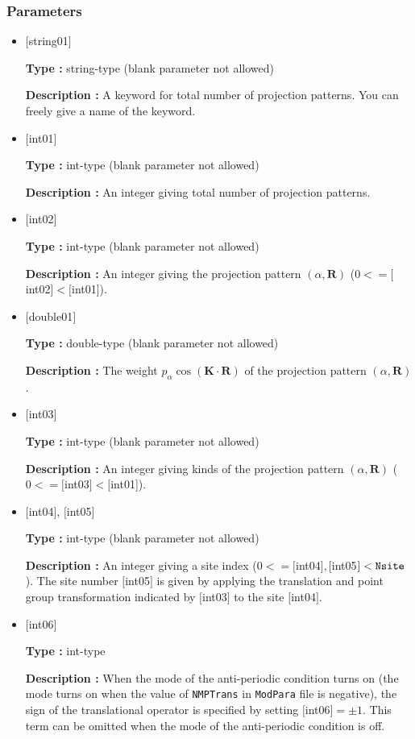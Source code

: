 \subsubsection{Parameters}
 \begin{itemize}

   \item  $[$string01$]$
   
    {\bf Type :} string-type (blank parameter not allowed)

   {\bf Description :} A keyword for total number of projection patterns. You can freely give a name of the keyword.

   \item  $[$int01$]$
   
    {\bf Type :} int-type (blank parameter not allowed)

   {\bf Description :} An integer giving total number of projection patterns. 

  \item  $[$int02$]$
   
 {\bf Type :} int-type (blank parameter not allowed)

{\bf Description :} An integer giving the projection pattern $(\alpha, {\bm R})$ ($0<= [$int02$]<[$int01]). 
 
  \item  $[$double01$]$
   
 {\bf Type :} double-type (blank parameter not allowed)

{\bf Description :} The weight $p_{\alpha}\cos ({\bm K}\cdot {\bm R})$ of the projection pattern $(\alpha, {\bm R})$.
 
 \item  $[$int03$]$
   
   {\bf Type :} int-type (blank parameter not allowed)

  {\bf Description :} An integer giving kinds of the projection pattern $(\alpha, {\bm R})$  ($0<= [$int03$]<[$int01]). 

 \item  $[$int04$]$, $[$int05$]$
   
   {\bf Type :} int-type (blank parameter not allowed)

  {\bf Description :} An integer giving a site index ($0<= [$int04$], [$int05$]<\verb|Nsite|$). 
  The site number $[$int05$]$ is given by applying the translation and point group transformation indicated by $[$int03$]$ to the site $[$int04$]$.

 \item  $[$int06$]$
   
   {\bf Type :} int-type

  {\bf Description :} When the mode of the anti-periodic condition turns on (the mode turns on when the value of \verb|NMPTrans| in \verb|ModPara| file is negative), the sign of the translational operator is specified by setting $[$int06$]=\pm1$. This term can be omitted when the mode of the anti-periodic condition is off.

\end{itemize}

